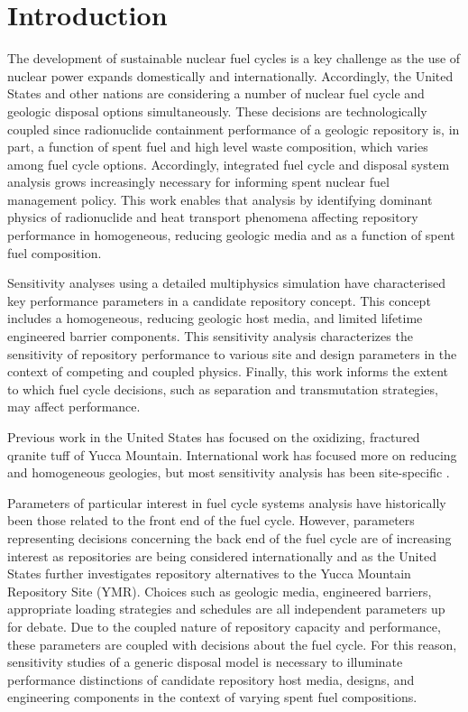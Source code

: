 
\section{Introduction}

The development of sustainable nuclear fuel cycles is a key challenge as the use 
of nuclear power expands domestically and internationally. Accordingly, the 
United States and other nations are considering a number of nuclear fuel cycle 
and geologic disposal options simultaneously. These decisions are 
technologically coupled since radionuclide containment performance of a geologic 
repository is, in part, a function of spent fuel and high level waste 
composition, which varies among fuel cycle options. Accordingly, integrated 
fuel cycle and disposal system analysis grows increasingly necessary for 
informing spent nuclear fuel management policy.  This work enables that analysis 
by identifying dominant physics of radionuclide and heat transport phenomena 
affecting repository performance in homogeneous, reducing geologic media and as 
a function of spent fuel composition. 

Sensitivity analyses using a detailed multiphysics simulation have characterised 
key performance parameters in a candidate repository concept. This concept 
includes a homogeneous, reducing geologic host media, and limited lifetime 
engineered barrier components.  This sensitivity analysis characterizes the 
sensitivity of repository performance to various site and design parameters in 
the context of competing and coupled physics. Finally, this work informs the 
extent to which fuel cycle decisions, such as separation and transmutation 
strategies, may affect performance.

Previous work in the United States has focused on the oxidizing, fractured 
qranite tuff of Yucca Mountain. International work has focused more on reducing 
and homogeneous geologies, but most sensitivity analysis has been site-specific 
\cite{von_lensa_red-impact_2008}.

Parameters of particular interest in fuel cycle systems analysis have 
historically been those related to the front end of the fuel cycle. However, 
parameters representing decisions concerning the back end of the fuel cycle are 
of increasing interest as repositories are being considered internationally and 
as the United States further investigates repository alternatives to the Yucca 
Mountain Repository Site (YMR). Choices such as geologic media, engineered 
barriers, appropriate loading strategies and schedules are all independent 
parameters up for debate. Due to the coupled nature of repository capacity and 
performance, these parameters are coupled with decisions about the fuel cycle.  
For this reason, sensitivity studies of a generic disposal model is necessary to 
illuminate performance distinctions of candidate repository host media, designs, 
and engineering components in the context of varying spent fuel compositions. 
